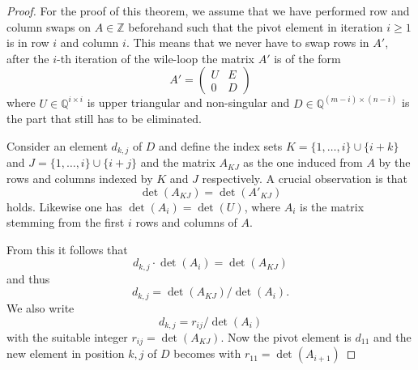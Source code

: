 \begin{proof}
For the proof of this theorem, we assume that we have performed row and column swaps on $A∈ ℤ$ beforehand such that the pivot element in iteration $i≥1$    is in row $i$ and column $i$. This means that we never have to swap rows in $A'$, after the $i$-th iteration of the wile-loop the matrix $A'$ is of the form 
\begin{displaymath}
  A' =
  \begin{pmatrix}
    U &  E \\
    0 & D 
  \end{pmatrix}
\end{displaymath}
where $U ∈ ℚ^{i ×i}$ is upper triangular and non-singular and $D ∈ ℚ^{(m-i) × (n-i)}$ is the part that still has to be eliminated. 



  Consider an element $d_{k,j}$ of $D$ and  define the index sets
  $K = \{1,\dots,i\} ∪\{i+ k\}$ and $J = \{1,\dots,i\}  ∪ \{i+ j\}$ and the matrix
  $A_{KJ}$ as the one induced from $A$ by the rows and columns indexed
  by $K$ and $J$ respectively. A crucial observation is that
  \begin{displaymath}
   \det(A_{KJ}) = \det(A'_{KJ}) 
 \end{displaymath}
 holds. Likewise one has $\det(A_i) = \det(U)$, where $A_i$ is the
 matrix stemming from the first $i$ rows and columns of $A$.


 From this it follows that
 \begin{displaymath}
  d_{k,j} ⋅ \det(A_i)  =   \det(A_{KJ}) 
 \end{displaymath}
 and thus
 \begin{displaymath}
   d_{k,j}  =   \det(A_{KJ})   / \det(A_i). 
 \end{displaymath}
 We also write
 \begin{displaymath}
   d_{k,j}  =   r_{ij}   / \det(A_i)
 \end{displaymath}
 with the suitable integer $r_{ij} = \det(A_{KJ})$. 
 Now the  pivot element is $d_{11}$ and the new element in position $k,j$ of $D$ becomes with $r_{11} = \det(A_{i+1})$ 


\end{proof}
